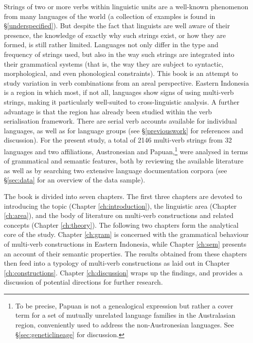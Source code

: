 Strings of two or more verbs within linguistic units are a well-known phenomenon from many languages of the world (a collection of examples is found in §\ref{underspecified}). But despite the fact that linguists are well aware of their presence, the knowledge of exactly why such strings exist, or how they are formed, is still rather limited. Languages not only differ in the type and frequency of strings used, but also in the way such strings are integrated into their grammatical systems (that is, the way they are subject to syntactic, morphological, and even phonological constraints). This book is an attempt to study variation in verb combinations from an areal perspective. Eastern Indonesia is a region in which most, if not all, languages show signs of using multi-verb strings, making it particularly well-suited to cross-linguistic analysis. A further advantage is that the region has already been studied within the verb serialisation framework. There are serial verb accounts available for individual languages, as well as for language groups (see §\ref{previouswork} for references and discussion). For the present study, a total of 2146 multi-verb strings from 32 languages and two affiliations, Austronesian and Papuan,\footnote{To be precise, Papuan is not a genealogical expression but rather a cover term for a set of mutually unrelated language families in the Australasian region, conveniently used to address the non-Austronesian languages. See §\ref{sec:geneticlineage} for discussion.} were analysed in terms of grammatical and semantic features, both by reviewing the available literature as well as by searching two extensive language documentation corpora (see §\ref{sec:data} for an overview of the data sample).

The book is divided into seven chapters. The first three chapters are devoted to introducing the topic (Chapter \ref{ch:introduction}), the linguistic area (Chapter \ref{ch:area}), and the body of literature on multi-verb constructions and related concepts (Chapter \ref{ch:theory}). The following two chapters form the analytical core of the study. Chapter \ref{ch:gram} is concerned with the grammatical behaviour of multi-verb constructions in Eastern Indonesia, while Chapter \ref{ch:sem} presents an account of their semantic properties. The results obtained from these chapters then feed into a typology of multi-verb constructions as laid out in Chapter \ref{ch:constructions}. Chapter \ref{ch:discussion} wraps up the findings, and provides a discussion of potential directions for further research. 

